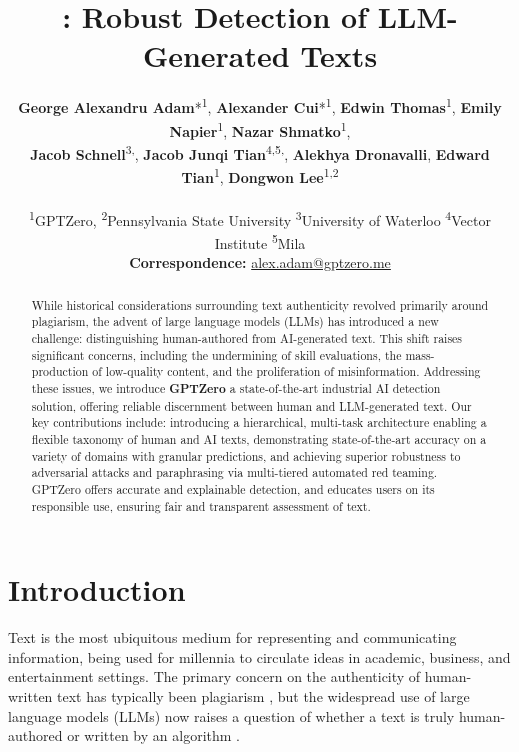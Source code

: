 \documentclass[11pt]{article}
\title{\gptzero: Robust Detection of LLM-Generated Texts}
\author{
 \textbf{George Alexandru Adam}*\textsuperscript{1},
 \textbf{Alexander Cui}*\textsuperscript{1},
 \textbf{Edwin Thomas}\textsuperscript{1},
 \textbf{Emily Napier}\textsuperscript{1},
 \textbf{Nazar Shmatko}\textsuperscript{1},
\\
 \textbf{Jacob Schnell}\textsuperscript{3,\dag},
 \textbf{Jacob Junqi Tian}\textsuperscript{4,5,\dag},
 \textbf{Alekhya Dronavalli}\textsuperscript{\dag},
 \textbf{Edward Tian}\textsuperscript{1},
 \textbf{Dongwon Lee}\textsuperscript{1,2}
\\
\\
 \textsuperscript{1}GPTZero,
 \textsuperscript{2}Pennsylvania State University
 \textsuperscript{3}University of Waterloo
 \textsuperscript{4}Vector Institute
 \textsuperscript{5}Mila
\\
 \small{
   \textbf{Correspondence:} \href{mailto:email@domain}{alex.adam@gptzero.me}
 }
}
\newcommand{\lee}[1]{{\color{purple}{DL: #1}}}
\newcommand{\gptzero}{GPTZero}
\begin{document}
\maketitle
\begin{abstract}
While historical considerations surrounding text authenticity revolved primarily around plagiarism, the advent of large language models (LLMs) has introduced a new challenge: distinguishing human-authored from AI-generated text. 
This shift raises significant concerns, including the undermining of skill evaluations, the mass-production of low-quality content, and the proliferation of misinformation. 
Addressing these issues, we introduce {\bf {\gptzero}}
a state-of-the-art industrial AI detection solution, offering reliable discernment between human and LLM-generated text. 
Our key contributions include: introducing a hierarchical, multi-task architecture enabling a flexible taxonomy of human and AI texts, demonstrating state-of-the-art accuracy on a variety of domains with granular predictions, and achieving superior robustness to adversarial attacks and paraphrasing via multi-tiered automated red teaming.
\gptzero{} offers accurate and explainable detection, and educates users on its responsible use, ensuring fair and transparent assessment of text.
\end{abstract}


\begingroup
\renewcommand{\thefootnote}{\fnsymbol{footnote}}
\footnotetext[2]{Work done while at \gptzero.}
\endgroup

\section{Introduction}
Text is the most ubiquitous medium for representing and communicating information, being used for millennia to circulate ideas in academic, business, and entertainment settings. 
The primary concern on the authenticity of human-written text has typically been plagiarism \cite{Randall2001-dw}, but the widespread use of large language models (LLMs) now raises a question of whether a text is truly human-authored or written by an algorithm \cite{Padillah2024-js}.

\end{document}
